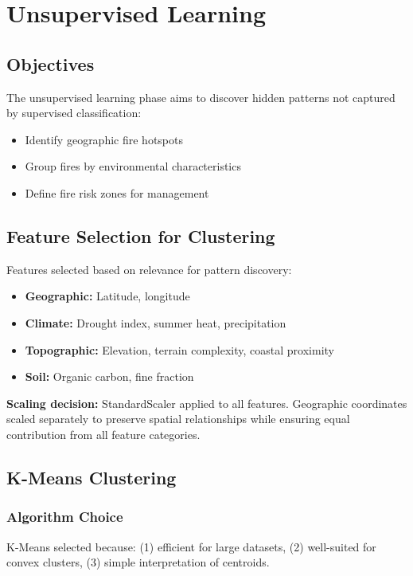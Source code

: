 \chapter{Unsupervised Learning}

\section{Objectives}
The unsupervised learning phase aims to discover hidden patterns not captured by supervised classification:
\begin{itemize}
    \item Identify geographic fire hotspots
    \item Group fires by environmental characteristics
    \item Define fire risk zones for management
\end{itemize}

\section{Feature Selection for Clustering}
Features selected based on relevance for pattern discovery:
\begin{itemize}
    \item \textbf{Geographic:} Latitude, longitude
    \item \textbf{Climate:} Drought index, summer heat, precipitation
    \item \textbf{Topographic:} Elevation, terrain complexity, coastal proximity
    \item \textbf{Soil:} Organic carbon, fine fraction
\end{itemize}

\textbf{Scaling decision:} StandardScaler applied to all features. Geographic coordinates scaled separately to preserve spatial relationships while ensuring equal contribution from all feature categories.

\section{K-Means Clustering}

\subsection*{Algorithm Choice}
K-Means selected because: (1) efficient for large datasets, (2) well-suited for convex clusters, (3) simple interpretation of centroids.

